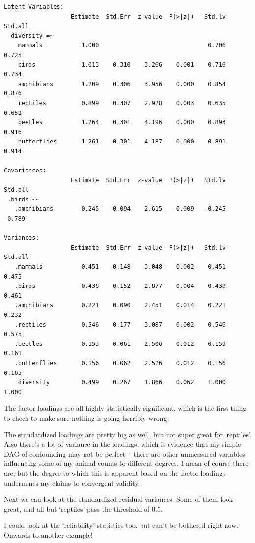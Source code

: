 \documentclass[
  letterpaper,
  DIV=11,
  numbers=noendperiod]{scrreprt}
\begin{document}
\begin{verbatim}
Latent Variables:
                   Estimate  Std.Err  z-value  P(>|z|)   Std.lv  Std.all
  diversity =~                                                          
    mammals           1.000                               0.706    0.725
    birds             1.013    0.310    3.266    0.001    0.716    0.734
    amphibians        1.209    0.306    3.956    0.000    0.854    0.876
    reptiles          0.899    0.307    2.928    0.003    0.635    0.652
    beetles           1.264    0.301    4.196    0.000    0.893    0.916
    butterflies       1.261    0.301    4.187    0.000    0.891    0.914

Covariances:
                   Estimate  Std.Err  z-value  P(>|z|)   Std.lv  Std.all
 .birds ~~                                                              
   .amphibians       -0.245    0.094   -2.615    0.009   -0.245   -0.789

Variances:
                   Estimate  Std.Err  z-value  P(>|z|)   Std.lv  Std.all
   .mammals           0.451    0.148    3.048    0.002    0.451    0.475
   .birds             0.438    0.152    2.877    0.004    0.438    0.461
   .amphibians        0.221    0.090    2.451    0.014    0.221    0.232
   .reptiles          0.546    0.177    3.087    0.002    0.546    0.575
   .beetles           0.153    0.061    2.506    0.012    0.153    0.161
   .butterflies       0.156    0.062    2.526    0.012    0.156    0.165
    diversity         0.499    0.267    1.866    0.062    1.000    1.000
\end{verbatim}

The factor loadings are all highly statistically significant, which is
the first thing to check to make sure nothing is going horribly wrong.

The standardized loadings are pretty big as well, but not super great
for `reptiles'. Also there's a lot of variance in the loadings, which is
evidence that my simple DAG of confounding may not be perfect -- there
are other unmeasured variables influencing some of my animal counts to
different degrees. I mean of course there are, but the degree to which
this is apparent based on the factor loadings undermines my claims to
convergent validity.

Next we can look at the standardized residual variances. Some of them
look great, and all but `reptiles' pass the threshold of 0.5.

I could look at the `reliability' statistics too, but can't be bothered
right now. Onwards to another example!
\end{document}
